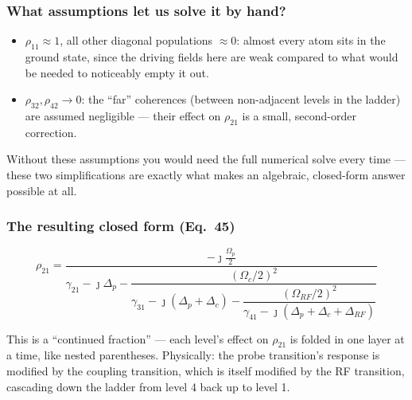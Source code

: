 \documentclass[11pt]{article}
\begin{document}
\subsubsection*{What assumptions let us solve it by hand?}
\begin{itemize}
\item $\rho_{11}\approx1$, all other diagonal populations $\approx0$: almost every atom sits in the ground state, since the driving fields here are weak compared to what would be needed to noticeably empty it out.
\item $\rho_{32},\rho_{42}\to0$: the ``far'' coherences (between non-adjacent levels in the ladder) are assumed negligible --- their effect on $\rho_{21}$ is a small, second-order correction.
\end{itemize}
\begin{ifnot}
Without these assumptions you would need the full numerical solve every time --- these two simplifications are exactly what makes an algebraic, closed-form answer possible at all.
\end{ifnot}

\subsubsection*{The resulting closed form (Eq.~45)}
\[
\rho_{21} = \dfrac{-\jmath\frac{\Omega_p}{2}}{\gamma_{21}-\jmath\Delta_p-\dfrac{(\Omega_c/2)^2}{\gamma_{31}-\jmath(\Delta_p+\Delta_c)-\dfrac{(\Omega_{RF}/2)^2}{\gamma_{41}-\jmath(\Delta_p+\Delta_c+\Delta_{RF})}}}
\]
\begin{eqmeaning}
This is a ``continued fraction'' --- each level's effect on $\rho_{21}$ is folded in one layer at a time, like nested parentheses. Physically: the probe transition's response is modified by the coupling transition, which is itself modified by the RF transition, cascading down the ladder from level 4 back up to level 1.
\end{eqmeaning}
\end{document}
